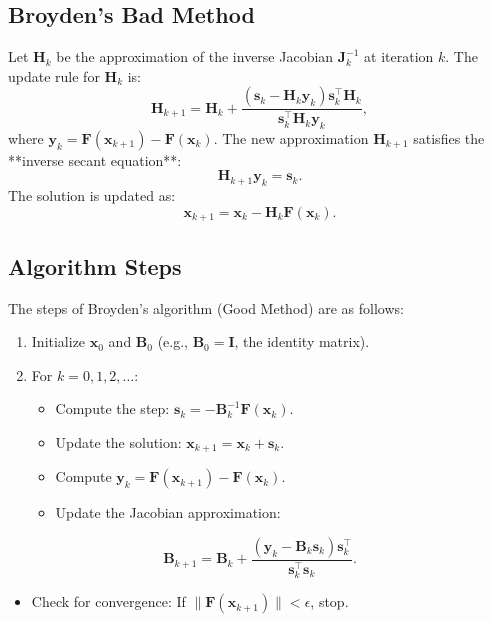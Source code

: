 \documentclass[%
oneside,                 %
final,                   %
10pt]{article}
\begin{document}
\subsection*{Broyden’s Bad Method}

Let \( \mathbf{H}_k \) be the approximation of the inverse Jacobian \( \mathbf{J}_k^{-1} \) at iteration \( k \). The update rule for \( \mathbf{H}_k \) is:
\[
\mathbf{H}_{k+1} = \mathbf{H}_k + \frac{(\mathbf{s}_k - \mathbf{H}_k \mathbf{y}_k) \mathbf{s}_k^\top \mathbf{H}_k}{\mathbf{s}_k^\top \mathbf{H}_k \mathbf{y}_k},
\]
where \( \mathbf{y}_k = \mathbf{F}(\mathbf{x}_{k+1}) - \mathbf{F}(\mathbf{x}_k) \). The new approximation \( \mathbf{H}_{k+1} \) satisfies the **inverse secant equation**:
\[
\mathbf{H}_{k+1} \mathbf{y}_k = \mathbf{s}_k.
\]
The solution is updated as:
\[
\mathbf{x}_{k+1} = \mathbf{x}_k - \mathbf{H}_k \mathbf{F}(\mathbf{x}_k).
\]

\subsection*{Algorithm Steps}

The steps of Broyden’s algorithm (Good Method) are as follows:
\begin{enumerate}
\item Initialize \( \mathbf{x}_0 \) and \( \mathbf{B}_0 \) (e.g., \( \mathbf{B}_0 = \mathbf{I} \), the identity matrix).

\item For \( k = 0, 1, 2, \dots \):
\begin{itemize}

  \item Compute the step: \( \mathbf{s}_k = -\mathbf{B}_k^{-1} \mathbf{F}(\mathbf{x}_k) \).

  \item Update the solution: \( \mathbf{x}_{k+1} = \mathbf{x}_k + \mathbf{s}_k \).

  \item Compute \( \mathbf{y}_k = \mathbf{F}(\mathbf{x}_{k+1}) - \mathbf{F}(\mathbf{x}_k) \).

  \item Update the Jacobian approximation:
\end{itemize}

\noindent
\end{enumerate}

\noindent
       \[
       \mathbf{B}_{k+1} = \mathbf{B}_k + \frac{(\mathbf{y}_k - \mathbf{B}_k \mathbf{s}_k) \mathbf{s}_k^\top}{\mathbf{s}_k^\top \mathbf{s}_k}.
       \]
\begin{itemize}
  \item Check for convergence: If \( \|\mathbf{F}(\mathbf{x}_{k+1})\| < \epsilon \), stop.
\end{itemize}
\end{document}
